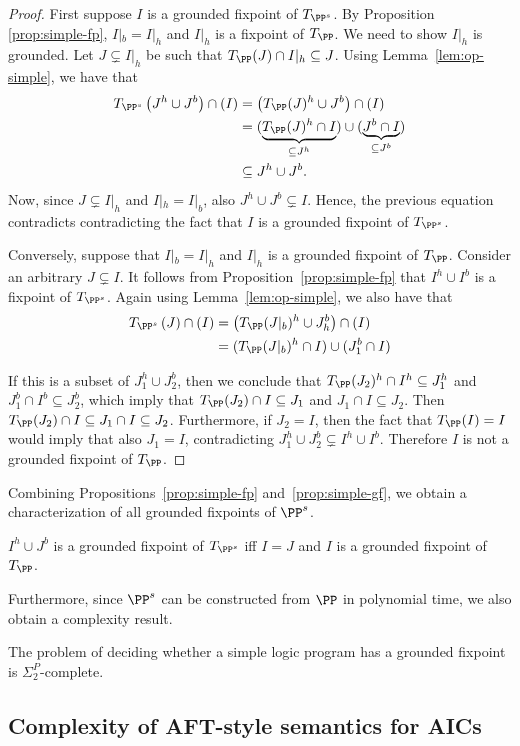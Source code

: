 {\begin{proof}
  First suppose $I$ is a grounded fixpoint of $T_{\PP^s}$.
  By Proposition \ref{prop:simple-fp}, $I|_b=I|_h$ and $I|_h$ is a fixpoint of $T_\PP$. We need to show $I|_h$ is grounded. 
  Let $J\subsetneq I|_h$ be such that $T_\PP(J)\cap I|_h\subseteq J$.
  Using Lemma~\ref{lem:op-simple}, we have that
  \begin{align*}
    T_{\PP^s}\left(J^h\cup J^b\right)\cap\left(I\right) &=
    \left(T_\PP(J)^h\cup J^b\right)\cap\left(I\right) \\
    &= (\underbrace{T_\PP(J)^h\cap I}_{\subseteq J^h})\cup(\underbrace{J^b\cap I}_{\subseteq J^b}) \\
    &\subseteq J^h\cup J^b.   
  \end{align*}
  Now, since $J\subsetneq I|_h$ and $I|_h=I|_b$, also $J^h\cup J^b \subsetneq I$. Hence, the previous equation contradicts contradicting the fact that $I$ is a grounded fixpoint of $T_{\PP^s}$.

  Conversely, suppose that $I|_b=I|_h$ and $I|_h$ is a grounded fixpoint of $T_\PP$. 
  Consider an arbitrary $J\subsetneq I$. 
  It follows from Proposition~\ref{prop:simple-fp} that $I^h\cup I^b$ is a fixpoint of $T_{\PP^s}$.
  Again using Lemma~\ref{lem:op-simple}, we also have that
  \begin{align*}
    T_{\PP^s}\left(J\right)\cap\left(I\right) &=
    \left(T_\PP(J|_b)^h\cup J_h^b\right)\cap\left(I\right) \\
    &= (T_\PP(J|_b)^h\cap I)\cup(J_1^b\cap I)
  \end{align*}

  If this is a subset of $J_1^h\cup J_2^b$, then we conclude that $T_\PP(J_2)^h\cap I^h\subseteq J_1^h$ and $J_1^b\cap I^b\subseteq J_2^b$, which imply that
  $T_\PP(J_2)\cap I\subseteq J_1$ and $J_1\cap I\subseteq J_2$.
  Then $T_\PP(J_2)\cap I\subseteq J_1\cap I\subseteq J_2$.
  Furthermore, if $J_2=I$, then the fact that $T_\PP(I)=I$ would imply that also $J_1=I$, contradicting $J_1^h\cup J_2^b\subsetneq I^h\cup I^b$.
  Therefore $I$ is not a grounded fixpoint of $T_\PP$.
\end{proof}

Combining Propositions~\ref{prop:simple-fp} and~\ref{prop:simple-gf}, we obtain a characterization of all grounded fixpoints of $\PP^s$.

\begin{corollary}
  $I^h\cup J^b$ is a grounded fixpoint of $T_{\PP^s}$ iff $I=J$ and $I$ is a grounded fixpoint of $T_\PP$.
\end{corollary}

Furthermore, since $\PP^s$ can be constructed from $\PP$ in polynomial time, we also obtain a complexity result.

\begin{corollary}
  \label{cor:simple-has-gf}
  The problem of deciding whether a simple logic program has a grounded fixpoint is $\Sigma^P_2$-complete.
\end{corollary}


\subsection{Complexity of AFT-style semantics for AICs}
}


